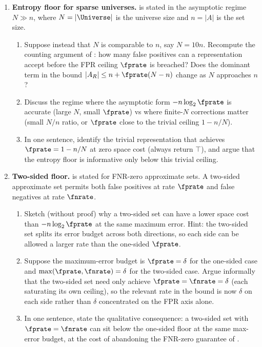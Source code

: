 \begin{enumerate}
\item \exstarstar
\label{ex:ch8-7}
\textbf{Entropy floor for sparse universes.}
 is stated in the asymptotic regime $N
\gg n$, where $N = |\Universe|$ is the universe size and $n = |A|$
is the set size.
\begin{enumerate}
  \item[(a)] Suppose instead that $N$ is comparable to $n$, say
    $N = 10 n$. Recompute the counting argument of
    : how many false positives can a
    representation accept before the FPR ceiling $\fprate$ is
    breached? Does the dominant term in the bound $|A_R| \le n +
    \fprate (N - n)$ change as $N$ approaches $n$?
  \item[(b)] Discuss the regime where the asymptotic form
    $-n \log_2 \fprate$ is accurate (large $N$, small $\fprate$)
    vs where finite-$N$ corrections matter (small $N/n$ ratio, or
    $\fprate$ close to the trivial ceiling $1 - n/N$).
  \item[(c)] In one sentence, identify the trivial representation
    that achieves $\fprate = 1 - n/N$ at zero space cost (always
    return $\top$), and argue that the entropy floor is
    informative only below this trivial ceiling.
\end{enumerate}

\item \exstarstar
\label{ex:ch8-8}
\textbf{Two-sided floor.}
 is stated for FNR-zero approximate sets.
A two-sided approximate set permits both false positives at rate
$\fprate$ and false negatives at rate $\fnrate$.
\begin{enumerate}
  \item[(a)] Sketch (without proof) why a two-sided set can have a
    lower space cost than $-n \log_2 \fprate$ at the same maximum
    error. Hint: the two-sided set splits its error budget across
    both directions, so each side can be allowed a larger rate
    than the one-sided $\fprate$.
  \item[(b)] Suppose the maximum-error budget is $\fprate = \delta$
    for the one-sided case and $\max(\fprate, \fnrate) = \delta$
    for the two-sided case. Argue informally that the two-sided
    set need only achieve $\fprate = \fnrate = \delta$ (each
    saturating its own ceiling), so the relevant rate in the
    bound is now $\delta$ on each side rather than $\delta$
    concentrated on the FPR axis alone.
  \item[(c)] In one sentence, state the qualitative consequence: a
    two-sided set with $\fprate = \fnrate$ can sit below the
    one-sided floor at the same max-error budget, at the cost of
    abandoning the FNR-zero guarantee of .
\end{enumerate}


\end{enumerate}
